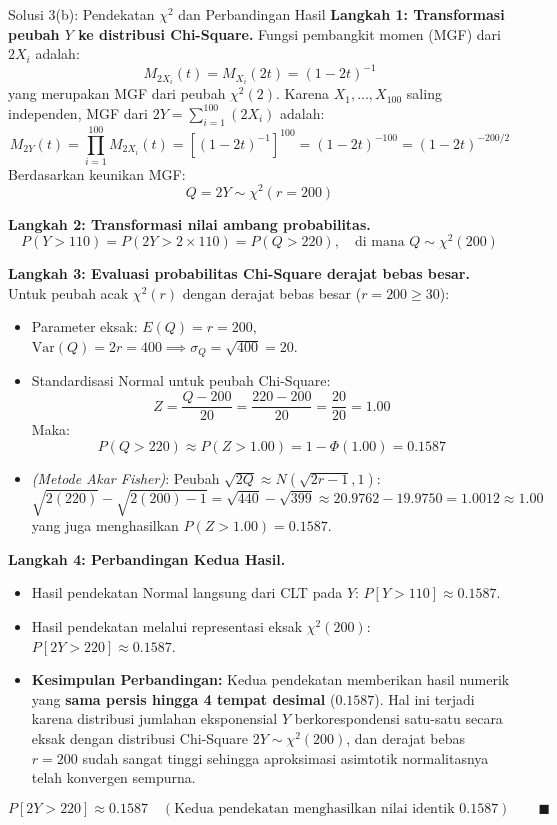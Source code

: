 \documentclass[10pt,twoside]{article}
\begin{document}
\begin{solbox}{Solusi 3(b): Pendekatan $\chi^2$ dan Perbandingan Hasil}
\textbf{Langkah 1: Transformasi peubah $Y$ ke distribusi Chi-Square.}
Fungsi pembangkit momen (MGF) dari $2X_i$ adalah:
\[
M_{2X_i}(t) = M_{X_i}(2t) = (1 - 2t)^{-1}
\]
yang merupakan MGF dari peubah $\chi^2(2)$.
Karena $X_1, \dots, X_{100}$ saling independen, MGF dari $2Y = \sum_{i=1}^{100} (2X_i)$ adalah:
\[
M_{2Y}(t) = \prod_{i=1}^{100} M_{2X_i}(t) = [(1 - 2t)^{-1}]^{100} = (1 - 2t)^{-100} = (1 - 2t)^{-200/2}
\]
Berdasarkan keunikan MGF:
\[
Q = 2Y \sim \chi^2(r = 200)
\]

\textbf{Langkah 2: Transformasi nilai ambang probabilitas.}
\[
P(Y > 110) = P(2Y > 2 \times 110) = P(Q > 220), \quad \text{di mana } Q \sim \chi^2(200)
\]

\textbf{Langkah 3: Evaluasi probabilitas Chi-Square derajat bebas besar.}
Untuk peubah acak $\chi^2(r)$ dengan derajat bebas besar ($r = 200 \ge 30$):
\begin{itemize}
  \item Parameter eksak: $E(Q) = r = 200$, $\mathrm{Var}(Q) = 2r = 400 \implies \sigma_Q = \sqrt{400} = 20$.
  \item Standardisasi Normal untuk peubah Chi-Square:
  \[
  Z = \frac{Q - 200}{20} = \frac{220 - 200}{20} = \frac{20}{20} = 1.00
  \]
  Maka:
  \[
  P(Q > 220) \approx P(Z > 1.00) = 1 - \Phi(1.00) = 0.1587
  \]
  \item \textit{(Metode Akar Fisher)}: Peubah $\sqrt{2Q} \approx N(\sqrt{2r-1}, 1)$:
  \[
  \sqrt{2(220)} - \sqrt{2(200)-1} = \sqrt{440} - \sqrt{399} \approx 20.9762 - 19.9750 = 1.0012 \approx 1.00
  \]
  yang juga menghasilkan $P(Z > 1.00) = 0.1587$.
\end{itemize}

\textbf{Langkah 4: Perbandingan Kedua Hasil.}
\begin{itemize}
  \item Hasil pendekatan Normal langsung dari CLT pada $Y$: $P[Y > 110] \approx 0.1587$.
  \item Hasil pendekatan melalui representasi eksak $\chi^2(200)$: $P[2Y > 220] \approx 0.1587$.
  \item \textbf{Kesimpulan Perbandingan:} Kedua pendekatan memberikan hasil numerik yang \textbf{sama persis hingga 4 tempat desimal} ($0.1587$). Hal ini terjadi karena distribusi jumlahan eksponensial $Y$ berkorespondensi satu-satu secara eksak dengan distribusi Chi-Square $2Y \sim \chi^2(200)$, dan derajat bebas $r = 200$ sudah sangat tinggi sehingga aproksimasi asimtotik normalitasnya telah konvergen sempurna.
\end{itemize}

\[
\boxed{P[2Y > 220] \approx 0.1587 \quad (\text{Kedua pendekatan menghasilkan nilai identik } 0.1587)} \qquad \blacksquare
\]
\end{solbox}
\end{document}
